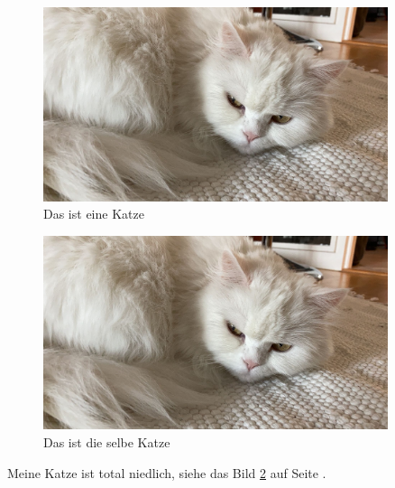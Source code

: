 \documentclass[ngerman,10pt,parskip=half]{scrartcl}
\begin{document}
\listoffigures

\blindtext

\begin{figure}[htb]
		\centering
	\includegraphics[width=0.9\textwidth]{./Bilder/miau.jpg}
	\caption{Das ist eine Katze}\label{fig:mieze}
\end{figure}

\begin{figure}[htb]
	\centering
	\includegraphics[width=0.9\textwidth]{./Bilder/miau.jpg}
	\caption{Das ist die selbe Katze}\label{fig:miau}
\end{figure}


\blindtext

\clearpage

\blindtext

Meine Katze ist total niedlich, siehe das Bild \ref{fig:miau} auf Seite \pageref{fig:miau}.
\end{document}
